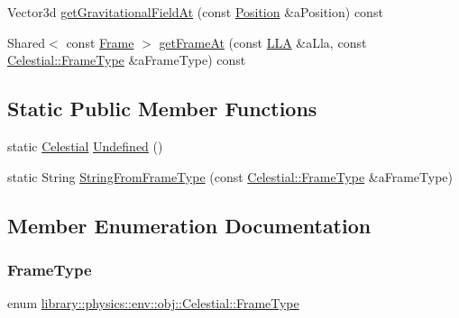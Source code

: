 \begin{DoxyCompactItemize}
\item 
Vector3d \hyperlink{classlibrary_1_1physics_1_1env_1_1obj_1_1_celestial_ac715a5cc62581070d55ab839e3309c9e}{get\+Gravitational\+Field\+At} (const \hyperlink{classlibrary_1_1physics_1_1coord_1_1_position}{Position} \&a\+Position) const
\item 
Shared$<$ const \hyperlink{classlibrary_1_1physics_1_1coord_1_1_frame}{Frame} $>$ \hyperlink{classlibrary_1_1physics_1_1env_1_1obj_1_1_celestial_ad1dfffd88b216eccf83a9441cae304be}{get\+Frame\+At} (const \hyperlink{classlibrary_1_1physics_1_1coord_1_1spherical_1_1_l_l_a}{L\+LA} \&a\+Lla, const \hyperlink{classlibrary_1_1physics_1_1env_1_1obj_1_1_celestial_a8585fb32125cb6c73ae1339a5ea09c79}{Celestial\+::\+Frame\+Type} \&a\+Frame\+Type) const
\end{DoxyCompactItemize}
\subsection*{Static Public Member Functions}
\begin{DoxyCompactItemize}
\item 
static \hyperlink{classlibrary_1_1physics_1_1env_1_1obj_1_1_celestial}{Celestial} \hyperlink{classlibrary_1_1physics_1_1env_1_1obj_1_1_celestial_a5e33230d05d77f5e1132151ecf5e94e9}{Undefined} ()
\item 
static String \hyperlink{classlibrary_1_1physics_1_1env_1_1obj_1_1_celestial_a020864aa551a1ec6f5674cc2e166b131}{String\+From\+Frame\+Type} (const \hyperlink{classlibrary_1_1physics_1_1env_1_1obj_1_1_celestial_a8585fb32125cb6c73ae1339a5ea09c79}{Celestial\+::\+Frame\+Type} \&a\+Frame\+Type)
\end{DoxyCompactItemize}


\subsection{Member Enumeration Documentation}
\mbox{\label{classlibrary_1_1physics_1_1env_1_1obj_1_1_celestial_a8585fb32125cb6c73ae1339a5ea09c79}} 
\subsubsection{\texorpdfstring{Frame\+Type}{FrameType}}
{\footnotesize\ttfamily enum \hyperlink{classlibrary_1_1physics_1_1env_1_1obj_1_1_celestial_a8585fb32125cb6c73ae1339a5ea09c79}{library\+::physics\+::env\+::obj\+::\+Celestial\+::\+Frame\+Type}\hspace{0.3cm}{\ttfamily [strong]}}

